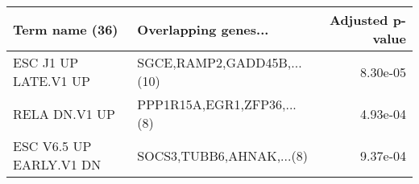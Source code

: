 \begin{tabular}{llr}
\toprule
         Term name (36) &       Overlapping genes... &  Adjusted p-value \\
\midrule
   ESC J1 UP LATE.V1 UP & SGCE,RAMP2,GADD45B,...(10) &          8.30e-05 \\
          RELA DN.V1 UP & PPP1R15A,EGR1,ZFP36,...(8) &          4.93e-04 \\
ESC V6.5 UP EARLY.V1 DN &   SOCS3,TUBB6,AHNAK,...(8) &          9.37e-04 \\
\bottomrule
\end{tabular}
